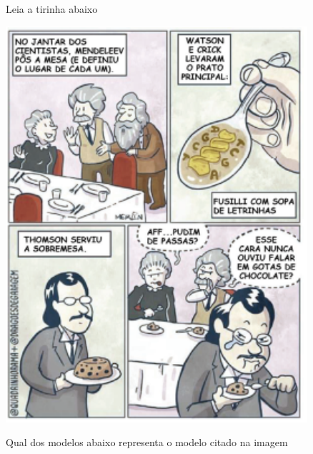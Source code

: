 \documentclass[11pt]{article}
\author{fabio}
\date{\today}
\title{}
\begin{document}
\tableofcontents


\begin{exercise}
Leia a tirinha abaixo

\begin{center}
\includegraphics[scale=1.5]{Adaptadas/cientistas.pdf}
\end{center}

Qual dos modelos abaixo representa o modelo citado na imagem


\end{exercise}
\end{document}
